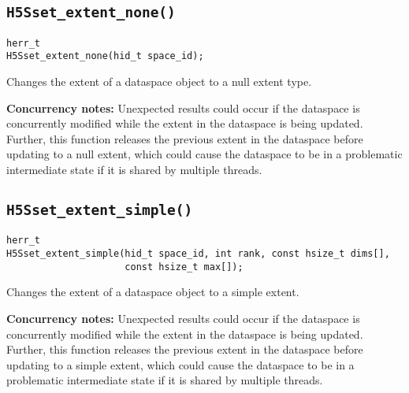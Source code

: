 \documentclass[../HDF5_RFC.tex]{subfiles}
\begin{document}
\subsection{\texttt{H5Sset\_extent\_none()}}
\label{apdx:h5s_func_h5sset_extent_none}

\begin{verbatim}
herr_t
H5Sset_extent_none(hid_t space_id);
\end{verbatim}

Changes the extent of a dataspace object to a null extent type.

\textbf{Concurrency notes:} Unexpected results could occur if the dataspace is concurrently
modified while the extent in the dataspace is being updated. Further, this function releases
the previous extent in the dataspace before updating to a null extent, which could cause the
dataspace to be in a problematic intermediate state if it is shared by multiple threads.

\subsection{\texttt{H5Sset\_extent\_simple()}}
\label{apdx:h5s_func_h5sset_extent_simple}

\begin{verbatim}
herr_t
H5Sset_extent_simple(hid_t space_id, int rank, const hsize_t dims[],
                     const hsize_t max[]);
\end{verbatim}

Changes the extent of a dataspace object to a simple extent.

\textbf{Concurrency notes:} Unexpected results could occur if the dataspace is concurrently
modified while the extent in the dataspace is being updated. Further, this function releases
the previous extent in the dataspace before updating to a simple extent, which could cause the
dataspace to be in a problematic intermediate state if it is shared by multiple threads.
\end{document}
